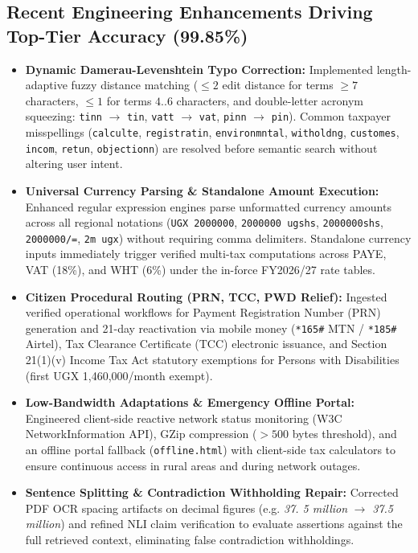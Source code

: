 \documentclass[10pt,a4paper]{article}
\begin{document}
\subsection{Recent Engineering Enhancements Driving Top-Tier Accuracy (99.85\%)}
\begin{itemize}[leftmargin=5mm,itemsep=1pt]
  \item \textbf{Dynamic Damerau-Levenshtein Typo Correction:} Implemented length-adaptive fuzzy distance matching ($\le 2$ edit distance for terms $\ge 7$ characters, $\le 1$ for terms $4..6$ characters, and double-letter acronym squeezing: \texttt{tinn} $\rightarrow$ \texttt{tin}, \texttt{vatt} $\rightarrow$ \texttt{vat}, \texttt{pinn} $\rightarrow$ \texttt{pin}). Common taxpayer misspellings (\texttt{calculte}, \texttt{registratin}, \texttt{environmntal}, \texttt{witholdng}, \texttt{customes}, \texttt{incom}, \texttt{retun}, \texttt{objectionn}) are resolved before semantic search without altering user intent.
  \item \textbf{Universal Currency Parsing \& Standalone Amount Execution:} Enhanced regular expression engines parse unformatted currency amounts across all regional notations (\texttt{UGX 2000000}, \texttt{2000000 ugshs}, \texttt{2000000shs}, \texttt{2000000/=}, \texttt{2m ugx}) without requiring comma delimiters. Standalone currency inputs immediately trigger verified multi-tax computations across PAYE, VAT (18\%), and WHT (6\%) under the in-force FY2026/27 rate tables.
  \item \textbf{Citizen Procedural Routing (PRN, TCC, PWD Relief):} Ingested verified operational workflows for Payment Registration Number (PRN) generation and 21-day reactivation via mobile money (\texttt{*165\#} MTN / \texttt{*185\#} Airtel), Tax Clearance Certificate (TCC) electronic issuance, and Section 21(1)(v) Income Tax Act statutory exemptions for Persons with Disabilities (first UGX 1,460,000/month exempt).
  \item \textbf{Low-Bandwidth Adaptations \& Emergency Offline Portal:} Engineered client-side reactive network status monitoring (W3C NetworkInformation API), GZip compression ($>500$ bytes threshold), and an offline portal fallback (\texttt{offline.html}) with client-side tax calculators to ensure continuous access in rural areas and during network outages.
  \item \textbf{Sentence Splitting \& Contradiction Withholding Repair:} Corrected PDF OCR spacing artifacts on decimal figures (e.g. \textit{37. 5 million} $\rightarrow$ \textit{37.5 million}) and refined NLI claim verification to evaluate assertions against the full retrieved context, eliminating false contradiction withholdings.
\end{itemize}
\end{document}
